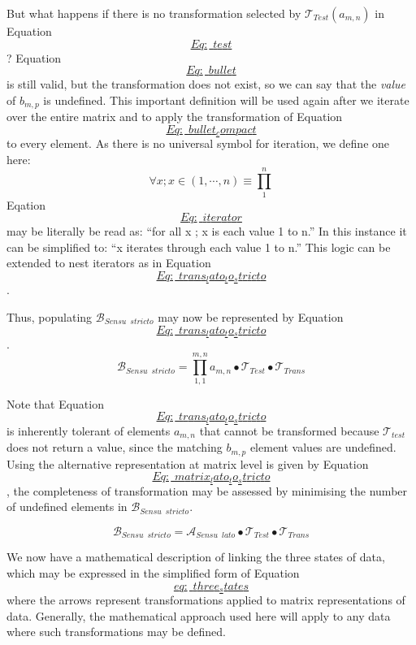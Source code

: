 \documentclass[
]{article}
\begin{document}
But what happens if there is no transformation selected by
\(\mathscr{T}_{Test}(a_{m,n})\) in Equation
\protect\hyperlink{Eq:_test}{\[Eq:\_test\]}?
Equation~\protect\hyperlink{Eq:_bullet}{\[Eq:\_bullet\]} is still valid,
but the transformation does not exist, so we can say that the
\emph{value} of \(b_{m,p}\) is undefined. This important definition will
be used again after we iterate over the entire matrix and to apply the
transformation of
Equation~\protect\hyperlink{Eq:_bullet_compact}{\[Eq:\_bullet_compact\]}
to every element. As there is no universal symbol for iteration, we
define one here: \[\label{Eq:_iterator}
    \forall x; x \in (1, \cdots, n) \equiv \prod_{1}^{n}\]
Eqation~\protect\hyperlink{Eq:_iterator}{\[Eq:\_iterator\]} may be
literally be read as: ``for all x ; x is each value 1 to n.'' In this
instance it can be simplified to: ``x iterates through each value 1 to
n.'' This logic can be extended to nest iterators as in
Equation~\protect\hyperlink{Eq:_trans_lato_to_stricto}{\[Eq:\_trans_lato_to_stricto\]}.

Thus, populating \(\mathscr{B}_{Sensu \enspace stricto}\) may now be
represented by
Equation~\protect\hyperlink{Eq:_trans_lato_to_stricto}{\[Eq:\_trans_lato_to_stricto\]}.
\[\label{Eq:_trans_lato_to_stricto}
    \mathscr{B}_{Sensu \enspace stricto} = \prod_{1,1}^{m,n} a_{m,n} \bullet \mathscr{T}_{Test} \bullet \mathscr{T}_{Trans}\]

Note that
Equation~\protect\hyperlink{Eq:_trans_lato_to_stricto}{\[Eq:\_trans_lato_to_stricto\]}
is inherently tolerant of elements \(a_{m,n}\) that cannot be
transformed because \(\mathscr{T}_{test}\) does not return a value,
since the matching \(b_{m,p}\) element values are undefined. Using the
alternative representation at matrix level is given by
Equation~\protect\hyperlink{Eq:_matrix_lato_to_stricto}{\[Eq:\_matrix_lato_to_stricto\]},
the completeness of transformation may be assessed by minimising the
number of undefined elements in
\(\mathscr{B}_{Sensu \enspace stricto}\).

\[\label{Eq:_matrix_lato_to_stricto}
    \mathscr{B}_{Sensu \enspace stricto} =  \mathscr{A}_{Sensu \enspace lato} \bullet \mathscr{T}_{Test} \bullet \mathscr{T}_{Trans}\]

We now have a mathematical description of linking the three states of
data, which may be expressed in the simplified form of
Equation~\protect\hyperlink{eq:_three_states}{\[eq:\_three_states\]}
where the arrows represent transformations applied to matrix
representations of data. Generally, the mathematical approach used here
will apply to any data where such transformations may be defined.
\end{document}

